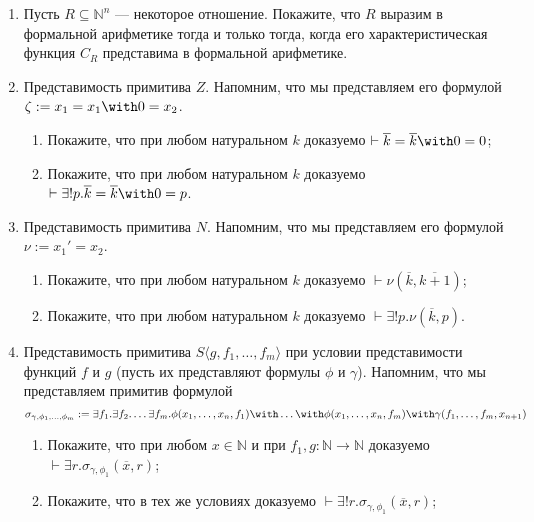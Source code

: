 \documentclass[10pt,a4paper,oneside]{article}
\begin{document}
\begin{enumerate}
\item Пусть $R \subseteq \mathbb{N}^n$ --- некоторое отношение. Покажите, что 
$R$ выразим в формальной арифметике тогда и только тогда, когда его характеристическая
функция $C_R$ представима в формальной арифметике.

\item Представимость примитива $Z$. Напомним, что мы представляем его формулой
$\zeta := x_1 = x_1 \with 0 = x_2$.
\begin{enumerate}
\item Покажите, что при любом натуральном $k$ доказуемо $\vdash \overline{k} = \overline{k} \with 0=0$;
\item Покажите, что при любом натуральном $k$ доказуемо $\vdash \exists ! p.\overline{k} = \overline{k} \with 0=p$.
\end{enumerate}

\item Представимость примитива $N$. Напомним, что мы представляем его формулой
$\nu := x_1' = x_2$.
\begin{enumerate}
\item Покажите, что при любом натуральном $k$ доказуемо $\vdash \nu(\overline{k},\overline{k+1})$;
\item Покажите, что при любом натуральном $k$ доказуемо $\vdash \exists ! p.\nu(\overline{k},p)$.
\end{enumerate}

\item Представимость примитива $S\langle g,f_1,\dots,f_m \rangle$ при условии представимости функций
$f$ и $g$ (пусть их представляют формулы $\phi$ и $\gamma$). Напомним, что мы 
представляем примитив формулой 
$$\sigma_{\gamma,\phi_1,\dots,\phi_m} := \exists f_1.\exists f_2.\dots\exists f_m.
   \phi(x_1,\dots,x_n,f_1)\with\dots\with\phi(x_1,\dots,x_n,f_m)\with\gamma(f_1,\dots,f_m,x_{n+1})
$$

\begin{enumerate}
\item Покажите, что при любом $x \in \mathbb{N}$ и при 
$f_1, g: \mathbb{N} \rightarrow \mathbb{N}$ доказуемо
$\vdash\exists r.\sigma_{\gamma,\phi_1} (\overline{x},r)$;
\item Покажите, что в тех же условиях доказуемо
$\vdash\exists ! r.\sigma_{\gamma,\phi_1} (\overline{x},r)$;
\end{enumerate}


\end{enumerate}
\end{document}
